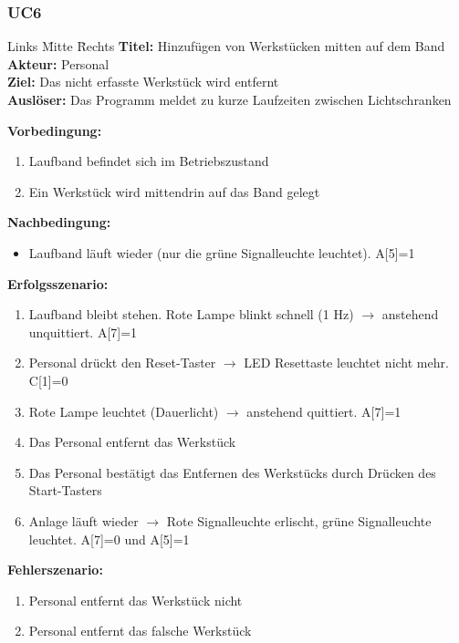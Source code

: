 \documentclass[oneside,a4paper,titlepage]{scrartcl} %
\begin{document}
\subsubsection{UC6}
\begin{tabbing}
 Links \= Mitte \= Rechts \kill
 \textbf{Titel:} \> \> Hinzufügen von Werkstücken mitten auf dem Band\\
 \textbf{Akteur:} \> \> Personal\\
 \textbf{Ziel:} \> \> Das nicht erfasste Werkstück wird entfernt\\
 \textbf{Auslöser:} \> \> Das Programm meldet zu kurze Laufzeiten zwischen Lichtschranken\\
\end{tabbing}
\textbf{Vorbedingung:}
\begin{enumerate}
 \item Laufband befindet sich im Betriebszustand
 \item Ein Werkstück wird mittendrin auf das Band gelegt
\end{enumerate}
\textbf{Nachbedingung:}
\begin{itemize}
 \item Laufband läuft wieder (nur die grüne Signalleuchte leuchtet). A[5]=1
\end{itemize}

\newpage

\textbf{Erfolgsszenario:}
\begin{enumerate}
 \item Laufband bleibt stehen. Rote Lampe blinkt schnell (1 Hz) $\rightarrow$ anstehend unquittiert. A[7]=1
 \item Personal drückt den Reset-Taster $\rightarrow$ LED Resettaste leuchtet nicht mehr. C[1]=0
 \item Rote Lampe leuchtet (Dauerlicht) $\rightarrow$ anstehend quittiert. A[7]=1
 \item Das Personal entfernt das Werkstück
 \item Das Personal bestätigt das Entfernen des Werkstücks durch Drücken des Start-Tasters
 \item Anlage läuft wieder $\rightarrow$ Rote Signalleuchte erlischt, grüne Signalleuchte leuchtet. A[7]=0 und A[5]=1
\end{enumerate}
\textbf{Fehlerszenario:}
\begin{enumerate}
    \item Personal entfernt das Werkstück nicht
    \item Personal entfernt das falsche Werkstück
\end{enumerate}
\end{document}
